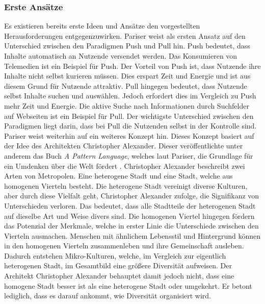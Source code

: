 \subsubsection{Erste Ansätze}
Es existieren bereits erste Ideen und Ansätze den vorgestellten Herausforderungen entgegenzuwirken.
Pariser weist als ersten Ansatz auf den Unterschied zwischen den Paradigmen Push und Pull hin.
Push bedeutet, dass Inhalte automatisch an Nutzende versendet werden.
Das Konsumieren von Telemedien ist ein Beispiel für Push.
Der Vorteil von Push ist, dass Nutzende ihre Inhalte nicht selbst kurieren müssen.
Dies erspart Zeit und Energie und ist aus diesem Grund für Nutzende attraktiv.
Pull hingegen bedeutet, dass Nutzende selbst Inhalte suchen und auswählen.
Jedoch erfordert dies im Vergleich zu Push mehr Zeit und Energie.
Die aktive Suche nach Informationen durch Suchfelder auf Webseiten ist ein Beispiel für Pull.
Der wichtigste Unterschied zwischen den Paradigmen liegt darin, dass bei Pull die Nutzenden selbst in der Kontrolle sind.\\

Pariser weist weiterhin auf ein weiteres Konzept hin.
Dieses Konzept basiert auf der Idee des Architekten Christopher Alexander.
Dieser veröffentlichte unter anderem das Buch \textit{A Pattern Language}, welches laut Pariser, die Grundlage für ein Umdenken über die Welt fördert \cite{a-pattern-language}.
Christopher Alexander beschreibt zwei Arten von Metropolen.
Eine heterogene Stadt und eine Stadt, welche aus homogenen Vierteln besteht.
Die heterogene Stadt vereinigt diverse Kulturen, aber durch diese Vielfalt geht, Christopher Alexander zufolge, die Signifikanz von Unterschieden verloren.
Das bedeutet, dass alle Stadtteile der heterogenen Stadt auf dieselbe Art und Weise divers sind.
Die homogenen Viertel hingegen fördern das Potenzial der Merkmale, welche in erster Linie die Unterschiede zwischen den Vierteln ausmachen.
Menschen mit ähnlichem Lebensstil und Hintergrund können in den homogenen Vierteln zusammenleben und ihre Gemeinschaft ausleben.
Dadurch entstehen Mikro-Kulturen, welche, im Vergleich zur eigentlich heterogenen Stadt, im Gesamtbild eine größere Diversität aufweisen.
Der Architekt Christopher Alexander behauptet damit jedoch nicht, dass eine homogene Stadt besser ist als eine heterogene Stadt oder umgekehrt.
Er betont lediglich, dass es darauf ankommt, wie Diversität organisiert wird.\\

